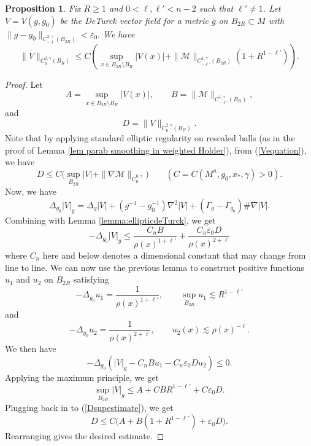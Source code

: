 \documentclass[12pt]{amsart}
\newcommand{\calM}{\mathcal{M}}
\renewcommand{\1}{{\mathbf 1}}
\newcommand{\eps}{{\varepsilon}}
\newtheorem{prop}[thm]{Proposition}
\theoremstyle{others}
\numberwithin{equation}{section}
\begin{document}
\begin{prop}\label{prop:ellipticestonV}
    Fix $R \geq 1$ and $0 < \ell, \ell' <n-2 $ such that $\ell' \ne 1$. 
    Let $V = V(g,g_0)$ be the DeTurck vector field for a metric $g$ on $B_{2R} \subset M$ with $\|g - g_0\|_{C^{2,\gamma}_{-\ell}(B_{2R})} < \eps_0.$ We have
    $$\| V \|_{C^{2,\gamma}_0(B_{R})} \leq C \left( \sup_{x \in B_{2R} \setminus B_R} |V(x)| + \| \calM \|_{C^{1,\gamma}_{- \ell'}(B_{2R})} \left( 1 + R^{1 - \ell'} \right) \right).$$
\end{prop}
\begin{proof}
Let
    $$A = \sup_{x \in B_{2R} \setminus B_R} |V(x)|, \qquad B = \| \calM \|_{C^{1,\gamma}_{- \ell'}(B_R)},$$
    and
    $$D = \| V \|_{C^{2, \gamma}_0(B_{R})}.$$
    Note that by applying standard elliptic regularity on rescaled balls (as in the proof of Lemma \ref{lem parab smoothing in weighted Holder}), from (\ref{Vequation}), we have
    \begin{equation}\label{Dsupestimate}
        D \leq { C \big(} \sup_{B_{2R}} |V| + \| \nabla \calM \|_{C^{0,\gamma}_{0}} {\big)}
        \qquad { (C = C(M^n, g_0, x_*, \gamma ) > 0)}.
    \end{equation}
    Now, we have
    $$\Delta_{g_0} |V|_{g} = \Delta_g |V| + (g^{-1} - g_0^{-1}) \nabla^2 |V| + (\Gamma_g - \Gamma_{g_0}) \# \nabla |V|.$$
    Combining with Lemma \ref{lemma:ellipticdeTurck}, we get 
    $$-\Delta_{g_0} |V|_{g} \leq \frac{{C_n} B}{\rho(x)^{1 + \ell'}} + \frac{{C_n} \eps_{0} D}{\rho(x)^{2 + \ell}}$$
    where $C_n$ here and below denotes a dimensional constant that may change from line to line.
    We can now use the previous lemma to construct positive functions $u_1$ and $u_2$ on $B_{2R}$ satisfying
    $$-\Delta_{g_0} u_1 = \frac{1}{\rho(x)^{1 + \ell'}}, \qquad \sup_{B_{2R}} u_1 {\lesssim} R^{1 - \ell'}$$
    and
    $$-\Delta_{g_0} u_2 = \frac{1}{\rho(x)^{2 + \ell}}, \qquad u_2 (x) {\lesssim} \rho(x)^{-\ell}.$$
    We then have
    $$-\Delta_{g_0} \left( |V|_g - {C_n} B u_1 - {C_n} \eps_{0} D u_2 \right) \leq 0.$$
    Applying the maximum principle, we get
    $$\sup_{B_{2R}} |V|_g \leq A + {C}B R^{1 - \ell'} + {C}\eps_{0} D.$$
    Plugging back in to (\ref{Dsupestimate}), we get
    $$D \leq {C \big( }A + B (1 + R^{1 - \ell'}) + \eps_0 D { \big)}.$$
    Rearranging gives the desired estimate.
\end{proof}
    
\end{document}
